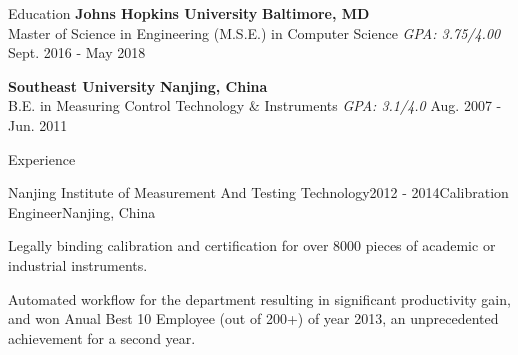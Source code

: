 \documentclass{resume} %
\begin{document}

\begin{rSection}{Education}
{\bf Johns Hopkins University} \hfill {\bf Baltimore, MD} \\
{Master of Science in Engineering (M.S.E.) in Computer Science} {\em GPA: 3.75/4.00} \hfill {Sept. 2016 - May 2018}

{\bf Southeast University} \hfill {\bf Nanjing, China} \\
{B.E. in Measuring Control Technology \& Instruments} {\em GPA: 3.1/4.0} \hfill {Aug. 2007 - Jun. 2011}
\end{rSection}



\begin{rSection}{Experience}

\begin{rSubsection}{Nanjing Institute of Measurement And Testing Technology}{2012 - 2014}{Calibration Engineer}{Nanjing, China}
\item Legally binding calibration and certification for over 8000 pieces of academic or industrial instruments.
\item Automated workflow for the department resulting in significant productivity gain, and won Anual Best 10 Employee (out of 200+) of year 2013, an unprecedented achievement for a second year.
\end{rSubsection}

\end{rSection}
\end{document}
